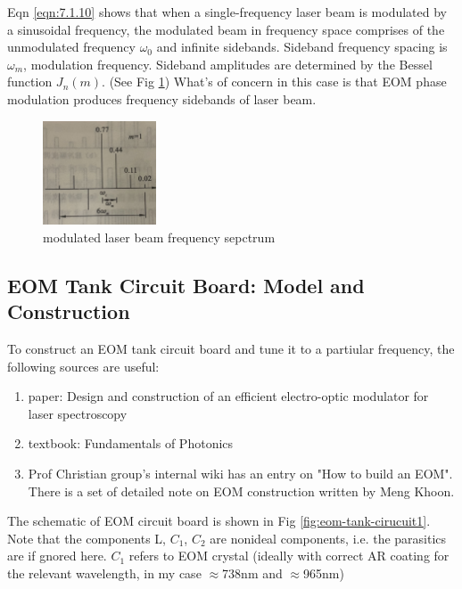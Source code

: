 \documentclass[12pt,A4Paper]{article}
\begin{document}
Eqn \ref{eqn:7.1.10} shows that when a single-frequency laser beam is modulated by a sinusoidal frequency, the modulated beam in frequency space comprises of the unmodulated frequency $\omega_0$ and infinite sidebands. Sideband frequency spacing is $\omega_m$, modulation frequency. 
Sideband amplitudes are determined by the Bessel function $J_n(m)$. (See Fig \ref{fig:EOMsidebandTheory}) What's of concern in this case is that EOM phase modulation produces frequency sidebands of laser beam. 

\begin{figure}[H]
    \centering
    \includegraphics[width=0.3\textwidth]{EOMsidebandTheory.png}
    \caption{modulated laser beam frequency sepctrum}
    \label{fig:EOMsidebandTheory}
\end{figure}

 \subsection{EOM Tank Circuit Board: Model and Construction}
To construct an EOM tank circuit board and tune it to a partiular frequency, the following sources are useful: 
\begin{enumerate}
    \item paper: Design and construction of an efficient electro-optic modulator for laser spectroscopy\cite{20MHzEOM}
    \item textbook: Fundamentals of Photonics\cite{fundamentalsOfPhotonics}
    \item Prof Christian group's internal wiki has an entry on "How to build an EOM". There is a set of detailed note on EOM construction written by Meng Khoon. 
\end{enumerate}
The schematic of EOM circuit board is shown in Fig \ref{fig:eom-tank-cirucuit1}. Note that the components L, $C_1$, $C_2$ are nonideal components, i.e. the parasitics are if gnored here.
$C_1$ refers to EOM crystal (ideally with correct AR coating for the relevant wavelength, in my case $\approx$738nm and $\approx$965nm)
\end{document}
